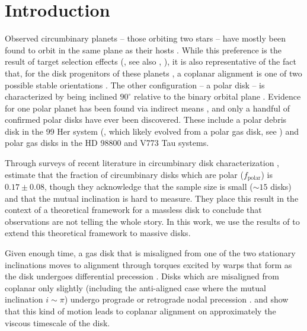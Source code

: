 \documentclass[twocolumn]{aastex631}
\begin{document}
\section{Introduction}
\label{sec:intro}


Observed circumbinary planets -- those orbiting two stars -- have mostly been found to orbit in the same plane as their hosts \citep{doyle2011,orosz2012,welsh2012}. While this preference is the result of target selection effects (\citealt{martin2014}, see also \citealt{martin2015}, \citealt{martin2017a}), it is also representative of the fact that, for the disk progenitors of these planets \citep[from which the planets inherit orbital parameters, see][]{childs2021}, a coplanar alignment is one of two possible stable orientations \citep{bate2000,lubow2000}. The other configuration -- a polar disk -- is characterized by being inclined $90^\circ$ relative to the binary orbital plane \citep{aly2015,martin2017}. Evidence for one polar planet has been found via indirect means \citep[AC Her, ][]{hillen2015,anugu2023,martin2023}, and only a handful of confirmed polar disks have ever been discovered. These include a polar debris disk in the 99 Her system (\citealt{kennedy2012}, which likely evolved from a polar gas disk, see \citealt{smallwood2020}) and polar gas disks in the HD 98800 \citep{kennedy2019} and V773 Tau \citep{kenworthy2022} systems.

Through surveys of recent literature in circumbinary disk characterization \citep{czekala2019,zurlo2023}, \citet{ceppi2024} estimate that the fraction of circumbinary disks which are polar ($f_\text{polar}$) is $0.17 \pm 0.08$, though they acknowledge that the sample size is small ($\sim 15$ disks) and that the mutual inclination is hard to measure. They place this result in the context of a theoretical framework for a massless disk \citep{farago2010,lubow2018,zanazzi2018} to conclude that observations are not telling the whole story. In this work, we use the results of \citet{martin2019} to extend this theoretical framework to massive disks.

Given enough time, a gas disk that is misaligned from one of the two stationary inclinations moves to alignment through torques excited by warps that form as the disk undergoes differential precession \citep{bate2000,lubow2000}. Disks which are misaligned from coplanar only slightly (including the anti-aligned case where the mutual inclination $i\sim\pi$) undergo prograde or retrograde nodal precession \citep{papaloizou1995}. \citet{bate2000} and \citet{lubow2000} show that this kind of motion  leads to coplanar alignment on approximately the viscous timescale of the disk.
\end{document}
